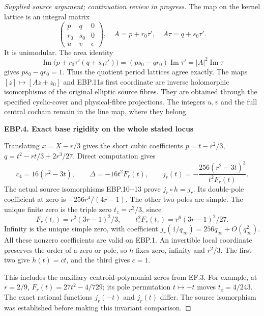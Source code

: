 \begin{proof}[Supplied source argument; continuation review in progress]
The map on the kernel lattice is an integral matrix
\[
 \begin{pmatrix}p&q&0\\r_0&s_0&0\\u&v&\epsilon\end{pmatrix},
 \quad A=p+r_0\tau',\quad A\tau=q+s_0\tau'.
 \tag{EBP.12}
\]
It is unimodular. The area identity
\[
 \operatorname{Im}\bigl(\overline{p+r_0\tau'}(q+s_0\tau')\bigr)
 =(ps_0-qr_0)\operatorname{Im}\tau'
 =|A|^2\operatorname{Im}\tau
 \tag{EBP.13}
\]
gives \(ps_0-qr_0=1\). Thus the quotient period lattices agree
exactly. The maps \([z]\mapsto[Az+z_0]\) and EBP.11\textquotesingle s first
coordinate are inverse holomorphic isomorphisms of the original
elliptic source fibres. They are obtained through the specified
cyclic-cover and physical-fibre projections. The integers \(u,v\)
and the full central cochain remain in the line map, where they belong.

\par

\medskip\noindent\textbf{EBP.4. Exact base rigidity on the whole stated locus}

\par\nobreak

Translating \(x=X-r/3\) gives the short cubic coefficients
\(p=t-r^2/3\), \(q=t^2-rt/3+2r^3/27\). Direct computation gives
\[
 c_4=16(r^2-3t),\qquad\Delta=-16t^2F_r(t),\qquad
 j_r(t)=-\frac{256(r^2-3t)^3}{t^2F_r(t)}.
 \tag{EBP.14}
\]
The actual source isomorphisms EBP.10-\/-13 prove \(j_r\circ h=j_r\).
Its double-pole coefficient at zero is \(-256r^4/(4r-1)\).
The other two poles are simple. The unique finite zero is the triple
zero \(t_z=r^2/3\), since
\[
 F_r(t_z)=r^2(3r-1)^2/3,\qquad
 t_z^2F_r(t_z)=r^6(3r-1)^2/27.
 \tag{EBP.15}
\]
Infinity is the unique simple zero, with coefficient
\(j_r(1/q_\infty)=256q_\infty+O(q_\infty^2)\).
All these nonzero coefficients are valid on EBP.1. An invertible local
coordinate preserves the order of a zero or pole, so \(h\) fixes
zero, infinity and \(r^2/3\). The first two give \(h(t)=ct\), and
the third gives \(c=1\).

This includes the auxiliary centroid-polynomial zeros from EF.3.
For example, at \(r=2/9\), \(F_r(t)=27t^2-4/729\); its pole
permutation \(t\mapsto-t\) moves \(t_z=4/243\). The exact
rational functions \(j_r(-t)\) and \(j_r(t)\) differ. The source
isomorphism was established before making this invariant comparison.

\par


\end{proof}
